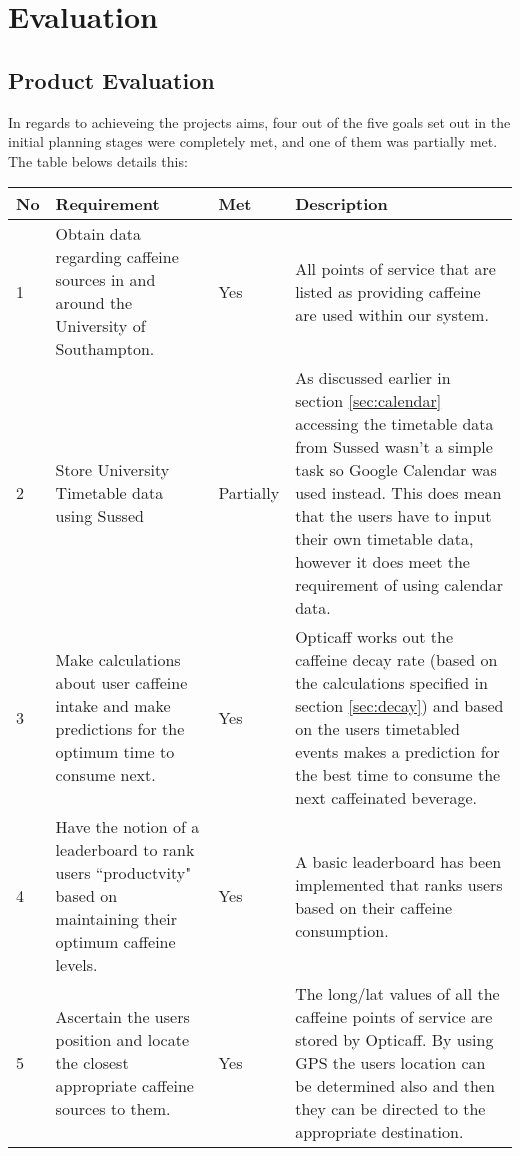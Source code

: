 \section{Evaluation}

\subsection{Product Evaluation}
In regards to achieveing the projects aims, four out of the five goals set out in the initial planning stages were completely met, and one of them was partially met. The table belows details this:

\begin{tabular}{|p{20pt}|p{140pt}|p{40pt}|p{210pt}|}
\hline
\textbf{No} & \textbf{Requirement} 													& \textbf{Met} 	& \textbf{Description} 
\\\hline
1		& Obtain data regarding caffeine sources in and around the University of Southampton.					& Yes		& All points of service that are listed as providing caffeine are used within our system. 
\\\hline
2 		& Store University Timetable data using Sussed										& Partially	& As discussed earlier in section \ref{sec:calendar} accessing the timetable data from Sussed wasn't a simple task so Google Calendar was used instead. This does mean that the users have to input their own timetable data, however it does meet the requirement of using calendar data. 
\\\hline
3 		& Make calculations about user caffeine intake and make predictions for the optimum time to consume next.		& Yes		& Opticaff works out the caffeine decay rate (based on the calculations specified in section \ref{sec:decay}) and based on the users timetabled events makes a prediction for the best time to consume the next caffeinated beverage. 	
\\\hline
4 		& Have the notion of a leaderboard to rank users ``productvity" based on maintaining their optimum caffeine levels.	& Yes		& A basic leaderboard has been implemented that ranks users based on their caffeine consumption. 
\\\hline
5 		& Ascertain the users position and locate the closest appropriate caffeine sources to them.				& Yes		& The long/lat values of all the caffeine points of service are stored by Opticaff. By using GPS the users location can be determined also and then they can be directed to the appropriate destination. 
\\\hline
\end{tabular}

